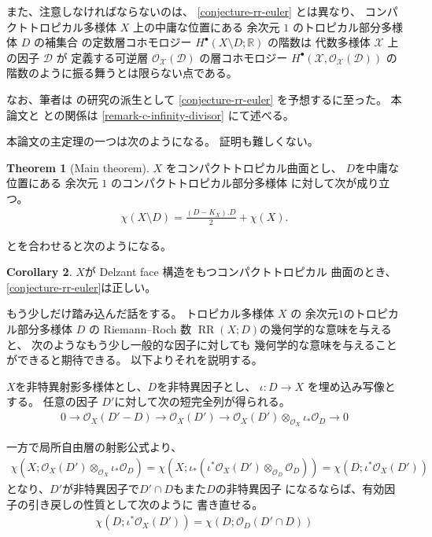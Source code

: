 \documentclass[a4paper,dvipdfmx,reqno,12pt]{amsart}
\theoremstyle{definition}
\newtheorem{theorem}{Theorem}[section]
\newtheorem{corollary}[theorem]{Corollary}
\newcommand{\opn}[1]{\operatorname{#1}}
\numberwithin{equation}{section}
\begin{document}
また、注意しなければならないのは、
\cref{conjecture-rr-euler} とは異なり、
コンパクトトロピカル多様体 $X$ 上の中庸な位置にある
余次元 $1$ のトロピカル部分多様体 $D$ の補集合
の定数層コホモロジー 
$H^{\bullet}(X\setminus D;\mathbb{R})$ の階数は
代数多様体 $\mathcal{X}$ 上の因子 $\mathcal{D}$ が
定義する可逆層 $\mathcal{O}_{\mathcal{X}}(\mathcal{D})$
の層コホモロジー $H^{\bullet}(\mathcal{X},
\mathcal{O}_{\mathcal{X}}(\mathcal{D}))$
の階数のように振る舞うとは限らない点である。

なお、筆者は \cite{tsutsui2023graded} 
の研究の派生として \cref{conjecture-rr-euler}
を予想するに至った。
本論文と \cite{tsutsui2023graded}
との関係は \cref{remark-c-infinity-divisor}
にて述べる。

本論文の主定理の一つは次のようになる。
証明も難しくない。
\begin{theorem}[{Main theorem}]
\label{theorem-rr-euler-surface}
$X$ をコンパクトトロピカル曲面とし、
$D$を中庸な位置にある
余次元 $1$ のコンパクトトロピカル部分多様体
に対して次が成り立つ。
\begin{align}
\chi(X\setminus D)=\frac{(D-K_X). D}{2}+
\chi(X).
\end{align}
\end{theorem}

\cite[Theorem 6.3]{demedrano2023chern}
とを合わせると次のようになる。
\begin{corollary}
\label{corollary-ds-euler-rr}
$X$が Delzant face 構造をもつコンパクトトロピカル
曲面のとき、 \cref{conjecture-rr-euler}は正しい。
\end{corollary}



もう少しだけ踏み込んだ話をする。
トロピカル多様体 $X$ の
余次元$1$のトロピカル部分多様体 $D$ の
Riemann--Roch 数
$\opn{RR}(X;D)$の幾何学的な意味を与えると、
次のようなもう少し一般的な因子に対しても
幾何学的な意味を与えることができると期待できる。
以下よりそれを説明する。

$X$を非特異射影多様体とし、$D$を非特異因子とし、
$\iota\colon D\to X$ を埋め込み写像とする。
任意の因子 $D'$に対して次の短完全列が得られる。
\begin{align}
0 \to \mathcal{O}_X(D'-D)\to \mathcal{O}_X(D')
\to \mathcal{O}_X(D')
\otimes_{\mathcal{O}_X} \iota_*\mathcal{O}_D \to 0 
\end{align}

一方で局所自由層の射影公式より、
\begin{align}
\chi(X;\mathcal{O}_X(D')\otimes_{\mathcal{O}_X} \iota_*\mathcal{O}_D)
=\chi(X;\iota_*(\iota^{*}\mathcal{O}_X(D')\otimes_{\mathcal{O}_D} \mathcal{O}_D))
=\chi(D;\iota^{*}\mathcal{O}_X(D'))
\end{align}
となり、$D'$が非特異因子で$D'\cap D$もまた$D$の非特異因子
になるならば、有効因子の引き戻しの性質として次のように
書き直せる。
\begin{align}
\chi(D;\iota^{*}\mathcal{O}_X(D'))=\chi(D;\mathcal{O}_D(D'\cap D))
\end{align}
\end{document}
